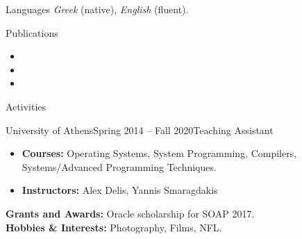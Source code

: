 \documentclass{resume}
\begin{document}
\begin{rSection}{Languages}
  \textit{Greek} (native), \textit{English} (fluent).
\end{rSection}

\begin{rSection}{Publications}
  \begin{rSubsection}{}{}{}{}
    \begin{itemize}[label={-}]
      \setlength\itemsep{-0.5em}
        \item {}
        \item {}
        \item {}
    \end{itemize}
  \end{rSubsection}
\end{rSection}

\begin{rSection}{Activities}
  \begin{rSubsection}{University of Athens}{Spring 2014 -- Fall 2020}{Teaching Assistant}{}
    \begin{itemize}[label={-}]
      \setlength\itemsep{-0.5em}
        \item {\bf Courses:}  Operating Systems, System Programming, Compilers, Systems/Advanced Programming Techniques.
        \item {\bf Instructors:} Alex Delis, Yannis Smaragdakis
      \end{itemize}

    {\bf Grants and Awards:} Oracle scholarship for SOAP 2017. \\
    {\bf Hobbies \& Interests:} Photography, Films, NFL.
  \end{rSubsection}
\end{rSection}
\end{document}
